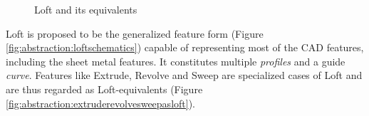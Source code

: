 \begin{figure}[!h]
\centering     %
{} \quad
{}
\caption{Loft and its equivalents}
\label{fig_lofts}
\end{figure}


Loft is proposed to be the generalized feature form (Figure \ref{fig:abstraction:loftschematics})  capable of representing  most of the CAD features, including the sheet metal features. It constitutes multiple {\em profiles} and a guide {\em curve}.  Features like Extrude, Revolve and Sweep are specialized cases of Loft and are thus regarded as Loft-equivalents (Figure \ref{fig:abstraction:extruderevolvesweepasloft}).
%
%
%
%

